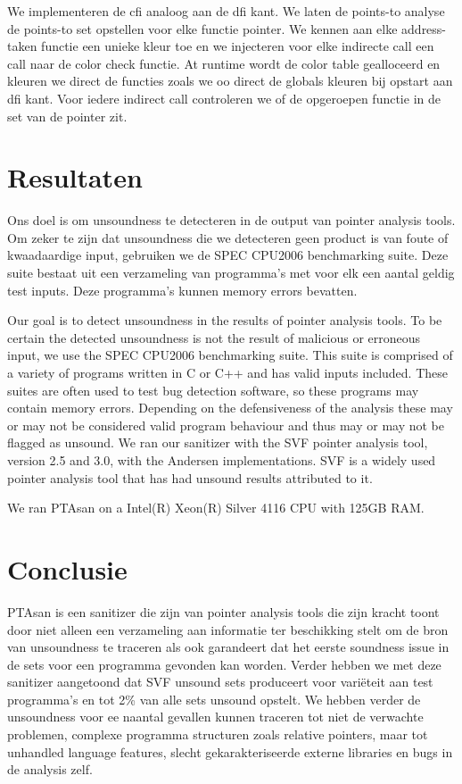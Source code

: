 \documentclass[conference]{IEEEtran}
\begin{document}
We implementeren de \gls{cfi} analoog aan de \gls{dfi} kant. We laten de points-to analyse de points-to set opstellen voor elke functie pointer. We kennen aan elke address-taken functie een unieke kleur toe en we injecteren voor elke indirecte call een call naar de color check functie. At runtime wordt de color table gealloceerd en kleuren we direct de functies zoals we oo direct de globals kleuren bij opstart aan \gls{dfi} kant. Voor iedere indirect call controleren we of de opgeroepen functie in de set van de pointer zit. 

\section{Resultaten} 

Ons doel is om unsoundness te detecteren in de output van pointer analysis tools. Om zeker te zijn dat unsoundness die we detecteren geen product is van foute of kwaadaardige input, gebruiken we de SPEC CPU2006 benchmarking suite. Deze suite bestaat uit een verzameling van programma's met voor elk een aantal geldig test inputs. Deze programma's kunnen memory errors bevatten. 

Our goal is to detect unsoundness in the results of pointer analysis tools. To be certain the detected unsoundness is not the result of malicious or erroneous 
input, we use the SPEC CPU2006 benchmarking suite. This suite is comprised of a variety of programs written in C or C++ and has valid inputs included. These suites are often 
used to test bug detection software\cite{xu_melton_2015}\cite{chen_source-level_2023}, so these programs may contain 
memory errors. Depending on the defensiveness of the analysis these may or may not be considered valid program behaviour and thus may or may not be flagged as unsound.
We ran our sanitizer with the SVF pointer analysis tool, version 2.5 and 3.0, with the Andersen implementations. SVF is a widely used pointer 
analysis\cite{kasten_integrating_2024}\cite{guo_bulkhead_2025}\cite{huang_taming_2022}
tool that has had unsound results attributed to it\cite{kasten_integrating_2024}. %

We ran PTAsan on a Intel(R) Xeon(R) Silver 4116 CPU with 125GB RAM.

\section{Conclusie}

PTAsan is een sanitizer die zijn van pointer analysis tools die zijn kracht toont door niet alleen een verzameling aan informatie ter beschikking stelt om de bron van unsoundness te traceren als ook garandeert dat het eerste soundness issue in de sets voor een programma gevonden kan worden. Verder hebben we met deze sanitizer aangetoond dat SVF unsound sets produceert voor variëteit aan test programma's en tot 2\% van alle sets unsound opstelt. We hebben verder de unsoundness voor ee naantal gevallen kunnen traceren tot niet de verwachte problemen, complexe programma structuren zoals relative pointers, maar tot unhandled language features, slecht gekarakteriseerde externe libraries en bugs in de analysis zelf.  
\end{document}
